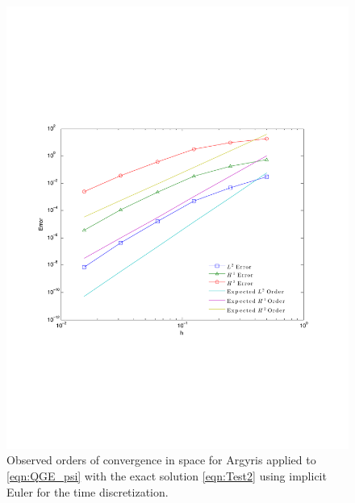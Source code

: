 \begin{figure}
  \begin{center}
    \includegraphics[scale=0.6]{Figures/expsinSpaceConvergence.pdf}
    \caption{Observed orders of convergence in space for Argyris applied to
      \eqref{eqn:QGE_psi} with the exact solution \eqref{eqn:Test2} using
      implicit Euler for the time discretization.}
  \label{fig:Test2Space}
  \end{center}
\end{figure}

